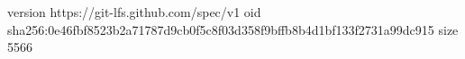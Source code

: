 version https://git-lfs.github.com/spec/v1
oid sha256:0e46fbf8523b2a71787d9cb0f5c8f03d358f9bffb8b4d1bf133f2731a99dc915
size 5566
